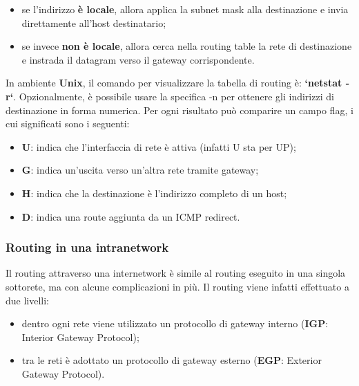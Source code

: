 \documentclass{article}
\begin{document}
            \begin{itemize}
                \item se l’indirizzo \textbf{è locale}, allora applica la subnet mask alla destinazione e invia
                direttamente all’host destinatario;
                \item se invece \textbf{non è locale}, allora cerca nella routing table la rete di destinazione e instrada
                il datagram verso il gateway corrispondente.
            \end{itemize}

            In ambiente \textbf{Unix}, il comando per visualizzare la tabella di routing è: \textbf{`netstat -r`}.
            Opzionalmente, è possibile usare la specifica -n per ottenere gli indirizzi di destinazione in
            forma numerica. Per ogni risultato può comparire un campo flag, i cui significati sono i seguenti:

            \begin{itemize}
                \item \textbf{U}: indica che l’interfaccia di rete è attiva (infatti U sta per UP);
                \item \textbf{G}: indica un’uscita verso un’altra rete tramite gateway;
                \item \textbf{H}: indica che la destinazione è l’indirizzo completo di un host;
                \item \textbf{D}: indica una route aggiunta da un ICMP redirect.
            \end{itemize}
            
            \subsubsection{Routing in una intranetwork}
            Il routing attraverso una internetwork è simile al routing eseguito in una singola sottorete, ma
            con alcune complicazioni in più. Il routing viene infatti effettuato a due livelli:

            \begin{itemize}
                \item dentro ogni rete viene utilizzato un protocollo di gateway interno
                (\textbf{IGP}: Interior Gateway Protocol);
                \item tra le reti è adottato un protocollo di gateway esterno (\textbf{EGP}: Exterior Gateway Protocol).
            \end{itemize}
\end{document}
